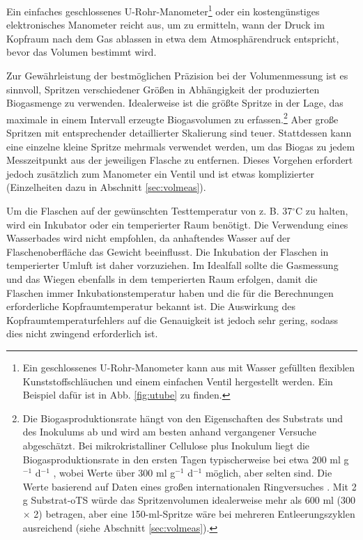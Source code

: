 \documentclass[]{article}
\begin{document}
Ein einfaches geschlossenes U-Rohr-Manometer\footnote{
  Ein geschlossenes U-Rohr-Manometer kann aus mit Wasser gefüllten flexiblen Kunststoffschläuchen und einem einfachen Ventil hergestellt werden. Ein Beispiel dafür ist in Abb. \ref{fig:utube} zu finden.
} oder ein kostengünstiges elektronisches Manometer reicht aus, um zu ermitteln, wann der Druck im Kopfraum nach dem Gas ablassen in etwa dem Atmosphärendruck entspricht, bevor das Volumen bestimmt wird.

Zur Gewährleistung der bestmöglichen Präzision bei der Volumenmessung ist es sinnvoll, Spritzen verschiedener Größen in Abhängigkeit der produzierten Biogasmenge zu verwenden.
Idealerweise ist die größte Spritze in der Lage, das maximale in einem Intervall erzeugte Biogasvolumen zu erfassen.\footnote{\label{fn:cellrate}Die Biogasproduktionsrate hängt von den Eigenschaften des Substrats und des Inokulums ab und wird am besten anhand vergangener Versuche abgeschätzt.
  Bei mikrokristalliner Cellulose plus Inokulum liegt die Biogasproduktionsrate in den ersten Tagen typischerweise bei etwa 200 ml g$^{-1}$ d$^{-1}$ , wobei Werte über 300 ml g$^{-1}$ d$^{-1}$ möglich, aber selten sind. Die Werte basierend auf Daten eines großen internationalen Ringversuches \citep{hafnerImprovingInterlaboratoryReproducibility2020}.
  Mit 2 g Substrat-oTS würde das Spritzenvolumen idealerweise mehr als 600 ml (300 $\times$ 2) betragen, aber eine 150-ml-Spritze wäre bei mehreren Entleerungszyklen ausreichend (siehe Abschnitt \ref{sec:volmeas}).}
Aber große Spritzen mit entsprechender detaillierter Skalierung sind teuer.
Stattdessen kann eine einzelne kleine Spritze mehrmals verwendet werden, um das Biogas zu jedem Messzeitpunkt aus der jeweiligen Flasche zu entfernen.
Dieses Vorgehen erfordert jedoch zusätzlich zum Manometer ein Ventil und ist etwas komplizierter (Einzelheiten dazu in Abschnitt \ref{sec:volmeas}).

Um die Flaschen auf der gewünschten Testtemperatur von z. B. 37$^\circ$C zu halten, wird ein Inkubator oder ein temperierter Raum benötigt.
Die Verwendung eines Wasserbades wird nicht empfohlen, da anhaftendes Wasser auf der Flaschenoberfläche das Gewicht beeinflusst. 
Die Inkubation der Flaschen in temperierter Umluft ist daher vorzuziehen.
Im Idealfall sollte die Gasmessung und das Wiegen ebenfalls in dem temperierten Raum erfolgen, damit die Flaschen immer Inkubationstemperatur haben und die für die Berechnungen erforderliche Kopfraumtemperatur bekannt ist.
Die Auswirkung des Kopfraumtemperaturfehlers auf die Genauigkeit ist jedoch sehr gering, sodass dies nicht zwingend erforderlich ist.
\end{document}

